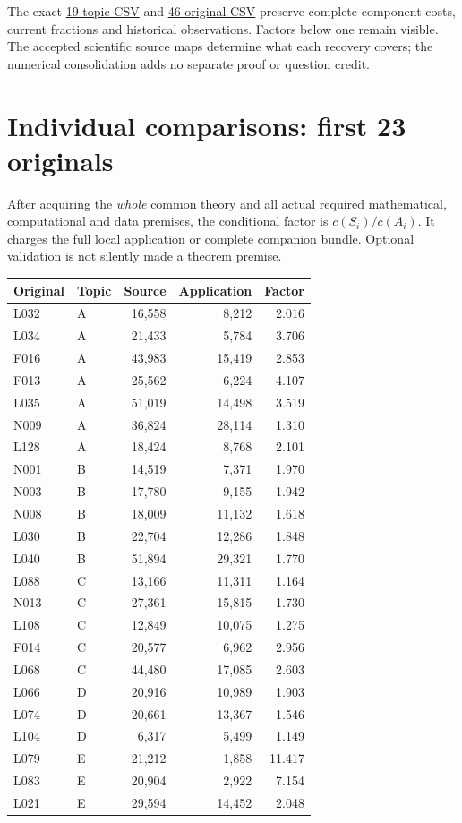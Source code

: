\documentclass[11pt,a4paper]{article}
\begin{document}
The exact \href{topics.csv}{19-topic CSV} and \href{applications.csv}{46-original CSV} preserve complete component costs, current fractions and historical observations. Factors below one remain visible. The accepted scientific source maps determine what each recovery covers; the numerical consolidation adds no separate proof or question credit.
\newpage
\section*{Individual comparisons: first 23 originals}
After acquiring the \emph{whole} common theory and all actual required mathematical, computational and data premises, the conditional factor is $c(S_i)/c(A_i)$. It charges the full local application or complete companion bundle. Optional validation is not silently made a theorem premise.
\begin{center}\small\begin{tabular}{llrrr}\toprule
Original & Topic & Source & Application & Factor\\\midrule
L032 & A & 16,558 & 8,212 & 2.016 \\
L034 & A & 21,433 & 5,784 & 3.706 \\
F016 & A & 43,983 & 15,419 & 2.853 \\
F013 & A & 25,562 & 6,224 & 4.107 \\
L035 & A & 51,019 & 14,498 & 3.519 \\
N009 & A & 36,824 & 28,114 & 1.310 \\
L128 & A & 18,424 & 8,768 & 2.101 \\
N001 & B & 14,519 & 7,371 & 1.970 \\
N003 & B & 17,780 & 9,155 & 1.942 \\
N008 & B & 18,009 & 11,132 & 1.618 \\
L030 & B & 22,704 & 12,286 & 1.848 \\
L040 & B & 51,894 & 29,321 & 1.770 \\
L088 & C & 13,166 & 11,311 & 1.164 \\
N013 & C & 27,361 & 15,815 & 1.730 \\
L108 & C & 12,849 & 10,075 & 1.275 \\
F014 & C & 20,577 & 6,962 & 2.956 \\
L068 & C & 44,480 & 17,085 & 2.603 \\
L066 & D & 20,916 & 10,989 & 1.903 \\
L074 & D & 20,661 & 13,367 & 1.546 \\
L104 & D & 6,317 & 5,499 & 1.149 \\
L079 & E & 21,212 & 1,858 & 11.417 \\
L083 & E & 20,904 & 2,922 & 7.154 \\
L021 & E & 29,594 & 14,452 & 2.048 \\\bottomrule\end{tabular}\end{center}
\end{document}

